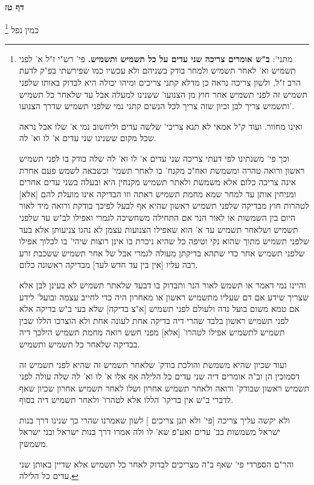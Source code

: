 \documentclass[12pt, openany]{book}
\newcommand{\sethebfont}{
\fontsize{10.5pt}{21.0pt} \selectfont
}
\newcommand{\twocol}[1]{
	{\sethebfont \begin{multicols}{2}
			#1
	\end{multicols}}	
}
\newcommand{\sectname}{}
\newcommand{\newsection}[1]{
	\addcontentsline{toc}{section}{#1}
	\renewcommand{\sectname}{#1}	
	\vspace{-\baselineskip}
	\begin{center}
		\textbf{%
\fontsize{16pt}{16pt}\selectfont
			#1}
	\end{center}
	\vspace{-\baselineskip}
	\nopagebreak
}
\newcommand{\footnotecomment}[1]{\footnote{#1}}
\newcommand{\commenta}[1]{\footnotecomment{#1}}
\begin{document}
\newsection{דף טז}
\twocol{כמין נפל 
\commenta{מתני': \textbf{ב"ש אומרים צריכה שני עדים על כל תשמיש ותשמיש.}  פי' רש"י ז"ל א' לפני תשמיש וא' לאחר תשמיש ולמחר בודק בשניהם ולא עכשיו כמו שפירשתי בפ"ק לדעת הרב ז"ל, ולשון צריכה נראה כן מדלא קתני צריכים ומיהו יכולה היא לבדוק באותו שלפני תשמיש זה לפני תשמיש אחר חוץ מן הצנועו' ששנינו למעלה אבל עד שלאחר כל תשמיש ותשמיש צריך לבן וכיון שזה צריך לכל הנשים קתני נמי שלפני תשמיש שדרך הצנועו'.\par ואינו מחוור. ועוד ק"ל אמאי לא תנא צריכי' שלשה עדים וליחשוב נמי א' שלו אבל נראה שכל מקום ששנינו שני עדים א' לו וא' לה.\par  וכך פי' משנתינו לפי דעתי צריכה שני עדים א' לו וא' לה שלה בודק בו לפני תשמיש ראשון ורואה טהרה ומשמשת ואח"כ מקנח' בו לאחר תשמי' וכשבאה לשמש פעם אחרת אינה צריכה כלום אלא משמשת ולאתר תשמיש מקנחין היא ובעלה בשני עדים אחרים ומניחין אותן עד למחר שמא מחמת תשמיש ראתה וזו הבדיקה אינו מועלת להם [אלא] לטהרות חוץ מבדיקה שלפני תשמיש ראשון שהיא אף לבעל לפיכך בודקת ורואה מיד לאור היום בין השמשות או לאור הנר אם התחילה משחשיכה לגמרי ואפילו לב"ש עד שלפני תשמיש ושלאחר תשמיש עד א' הוא שאפילו הצנועות עצמן לא נהגו צניעותן אלא בעד שלפני תשמיש מתוך שהוא נקי וטיפה כל שהיא ניכרת בו אינן רוצות שיהי' בו לכלוך אפילו שלפני תשמיש אחר כדי שתהא בדיקתן מעולה לגמרי אבל של אחר תשמיש ששכבת זרע רבה עליו [אין בין עד חדש לעד] מבדיקה ראשונה כלום.\par והיינו נמי דאמר או תשמש לאור הנר ותבדוק בו דבעד שלאתר תשמיש לא בעינן לבן אלא שצריך שידע אם דם שעליו מתשמיש ראשון או מאחרון היה כדי לחייב עצמה ובועל' לידע אם טמא משום בועל נדה ולעולם לפני תשמיש [א"צ בדיקה] שלא בעי ב"ש בדיקה אלא לפני תשמיש ראשון בלבד שהרי דיה בדיקה אחת לעונה אחת ולא הוצרכו הללו שבין תשמיש לתשמיש אפילו לטהרו' [אלא] מפני חשש רואה מחמת תשמיש הילכך דיה בבדיקה שלאחר כל תשמיש ותשמיש.\par ועוד שכיון שהיא משמשת והולכת בודק' שלאחר תשמיש זה שהיא לפני תשמיש זה דסמוכין הן וב"ה אומרים דיה שני עדים כל הלילה אף אלו א' לו וא' לה שלה עולה לפני תשמיש ראשון שבודק' ורואה ולאחר תשמיש אחרון ושלו לאחר תשמיש אחרון שכיון שאף לדברי ב"ש אין בדיקו' הללו אלא לטהרו' ולאחר תשמיש דיה בסוף.\par  ולא יקשה עליך צריכה [{\small פי' ולא תנן צריכים} ] לשון שאמרנו שהרי כך שנינו דרך בנות ישראל משמשות בב' עדים ואע"פ שא' לו ולה אמרו דרך בנות ישראל ובני ישראל משמשין.\par  והר"ם הספרדי פי' שאף ב"ה מצריכים לבדוק לאחר כל תשמיש אלא שדיין באותן שני עדים כל הלילה. }

}
\end{document}
